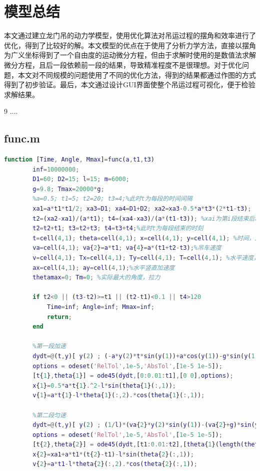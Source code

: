 \documentclass[withoutpreface,bwprint]{cumcmthesis} %
\begin{document}
\section{模型总结}
本文通过建立龙门吊的动力学模型，使用优化算法对吊运过程的摆角和效率进行了优化，得到了比较好的解。本文模型的优点在于使用了分析力学方法，直接以摆角为广义坐标得到了一个自由度的运动微分方程，但由于求解时使用的是数值法求解微分方程，且后一段依赖前一段的结果，导致精准程度不是很理想。对于优化问题，本文对不同规模的问题使用了不同的优化方法，得到的结果都通过作图的方式得到了初步验证。最后，本文通过设计GUI界面使整个吊运过程可视化，便于检验求解结果。
\begin{thebibliography}{9}%
     ....
\end{thebibliography}
\begin{appendices}
    \section{func.m}

    \begin{lstlisting}[language=matlab]
        function [Time, Angle, Mmax]=func(a,t1,t3)
        inf=10000000;
        D1=60; D2=15; l=15; m=6000;
        g=9.8; Tmax=20000*g;
        %a=0.5; t1=5; t2=20; t3=4;%此时t为每段的时间间隔
        xa1=a*t1*t1/2; xa3=D1; xa4=D1+D2; xa2=xa3-0.5*a*t3*(2*t1-t3);
        t2=(xa2-xa1)/(a*t1); t4=(xa4-xa3)/(a*(t1-t3)); %xai为第i段结束后吊车的位移
        t2=t2+t1; t3=t2+t3; t4=t3+t4;%此时t为每段结束的时刻
        t=cell(4,1); theta=cell(4,1); x=cell(4,1); y=cell(4,1); %时间，角度，横纵坐标
        va=cell(4,1); va{2}=a*t1; va{4}=a*(t1+t2-t3);%吊车速度
        v=cell(4,1); Tx=cell(4,1); Ty=cell(4,1); T=cell(4,1); %水平速度，拉力,
        ax=cell(4,1); ay=cell(4,1);%水平竖直加速度
        thetamax=0; Tm=0; %实际最大的角度，拉力
        
        if t2<0 || (t3-t2)>=t1 || (t2-t1)<0.1 || t4>120
            Time=inf; Angle=inf; Mmax=inf;
            return;
        end
        
        %第一段加速
        dydt=@(t,y)[ y(2) ; (-a*y(2)*t*sin(y(1))+a*cos(y(1))-g*sin(y(1)))/l ];
        options = odeset('RelTol',1e-5,'AbsTol',[1e-5 1e-5]);
        [t{1},theta{1}] = ode45(dydt,[0:0.01:t1],[0 0],options);
        x{1}=0.5*a*t{1}.^2-l*sin(theta{1}(:,1));
        v{1}=a*t{1}-l*theta{1}(:,2).*cos(theta{1}(:,1));
        
        %第二段匀速
        dydt=@(t,y)[ y(2) ; (1/l)*(va{2}*y(2)*sin(y(1))-(va{2}+g)*sin(y(1))) ];
        options = odeset('RelTol',1e-5,'AbsTol',[1e-5 1e-5]);
        [t{2},theta{2}] = ode45(dydt,[t1:0.01:t2],[theta{1}(length(theta{1}(:,1)),1) theta{1}(length(theta{1}(:,2)),2)],options);
        x{2}=xa1+a*t1*(t{2}-t1)-l*sin(theta{2}(:,1));
        v{2}=a*t1-l*theta{2}(:,2).*cos(theta{2}(:,1));
        

\end{lstlisting}
\end{appendices}
\end{document}
